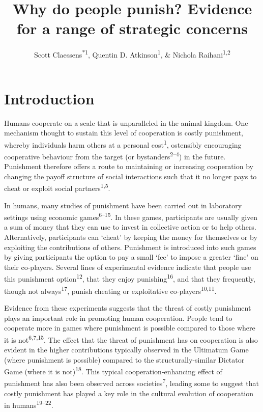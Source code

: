 \documentclass[
  man,floatsintext]{apa6}
\title{Why do people punish? Evidence for a range of strategic concerns}
\author{Scott Claessens\textsuperscript{*1}, Quentin D. Atkinson\textsuperscript{1}, \& Nichola Raihani\textsuperscript{1,2}}
\date{}
\affiliation{\vspace{0.5cm}\textsuperscript{1} \footnotesize School of Psychology, University of Auckland, Auckland, New Zealand\\\textsuperscript{2} \footnotesize Department of Experimental Psychology, University College London, London, United Kingdom}
\begin{document}
\maketitle

\linenumbers

\hypertarget{introduction}{%
\section{Introduction}\label{introduction}}

Humans cooperate on a scale that is unparalleled in the animal kingdom. One
mechanism thought to sustain this level of cooperation is costly punishment,
whereby individuals harm others at a personal cost\textsuperscript{1},
ostensibly encouraging cooperative behaviour from the target (or bystanders\textsuperscript{2--4}) in the future. Punishment
therefore offers a route to maintaining or increasing cooperation by changing
the payoff structure of social interactions such that it no longer pays to cheat
or exploit social partners\textsuperscript{1,5}.

In humans, many studies of punishment have been carried out in laboratory
settings using economic games\textsuperscript{6--15}. In these games, participants are usually given a sum of money
that they can use to invest in collective action or to help others.
Alternatively, participants can `cheat' by keeping the money for themselves or
by exploiting the contributions of others. Punishment is introduced into such
games by giving participants the option to pay a small `fee' to impose a greater
`fine' on their co-players. Several lines of experimental evidence indicate that
people use this punishment option\textsuperscript{12}, that they enjoy
punishing\textsuperscript{16}, and that they frequently, though not
always\textsuperscript{17}, punish cheating or exploitative
co-players\textsuperscript{10,11}.

Evidence from these experiments suggests that the threat of costly punishment
plays an important role in promoting human cooperation. People tend to cooperate
more in games where punishment is possible compared to those where it is not\textsuperscript{6,7,15}. The effect that the threat of
punishment has on cooperation is also evident in the higher contributions
typically observed in the Ultimatum Game (where punishment is possible) compared
to the structurally-similar Dictator Game (where it is not)\textsuperscript{18}. This
typical cooperation-enhancing effect of punishment has also been observed across
societies\textsuperscript{7}, leading some to suggest that costly punishment has
played a key role in the cultural evolution of cooperation in humans\textsuperscript{19--22}.
\end{document}
